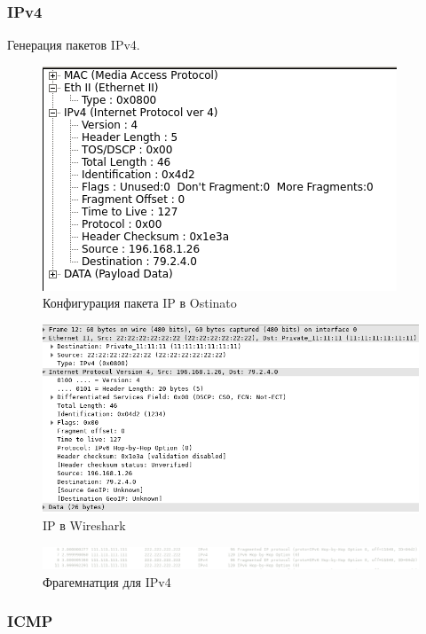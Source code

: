 \documentclass[12pt, a4paper] {ncc}
\begin{document}
\subsubsection*{IPv4}
	
	Генерация пакетов IPv4. \\

	\begin{figure}[h!]
		\includegraphics[scale=0.5]{IPStream_without_frag.png}
		\caption{Конфигурация пакета IP в Ostinato}
		\center
	\end{figure}

	\begin{figure}[h!]
		\includegraphics[scale=0.4]{CapturedIP.png}
		\caption{IP в Wireshark}
		\center
	\end{figure}
	\begin{figure}[h!]
		\includegraphics[scale=0.4]{./IPv4Frag.png}
		\caption{Фрагемнатция для IPv4}
		\center
	\end{figure}

\subsubsection*{ICMP}
\end{document}
